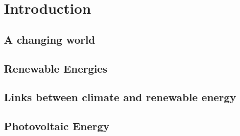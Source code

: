
\chapter{Introduction}
\section{A changing world} 
 
\section{Renewable Energies}




\section{Links between climate and renewable energy}
\section{Photovoltaic Energy}
